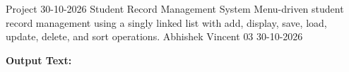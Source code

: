 \clearpage
\label{prog:57}
\programhead
  {Project}
  {30-10-2026}
  {Student Record Management System}
  {Menu-driven student record management using a singly linked list with add, display, save, load, update, delete, and sort operations.}
  {Abhishek Vincent}
  {03}
  {30-10-2026}

\divider
\textbf{Output Text:}\par
\vspace{2pt}

